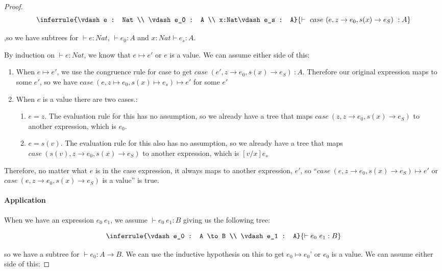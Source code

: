 \begin{proof}
$$
\inferrule {\vdash e : Nat \\  \vdash e_0 : A \\  x:Nat\vdash e_s : A}
  {\vdash \ case \ (e, z \to e_0 , s(x) \to e_S) \  : A}  
$$

,so we have subtrees for $\vdash e : Nat$, $ \vdash e_0 : A$ and $ x:Nat \vdash e_s : A$.

By induction on $\vdash e : Nat$, we know that $e \mapsto e'$ or $e$ is a value. We can assume either side of this:

\begin{enumerate}
\item{When $e \mapsto e'$, we use the congruence rule for case to get $case \ (e', z \to e_0 , s(x) \to e_S) \  : A$. Therefore our original expression maps to some $e'$, so we have $case \ (e,z \mapsto e_0, s(x) \mapsto e_s) \mapsto e'$ for some $e'$}
\item{When $e$ is a value there are two cases.:
\begin{enumerate}
\item{$e = z$. The evaluation rule for this has no assumption, so we already have a tree that maps $case \ (z, z \to e_0 , s(x) \to e_S)$ to another expression, which is $e_0$.}
\item{$e = s(v)$. The evaluation rule for this also has no assumption, so we already have a tree that maps $case \ (s(v), z \to e_0 , s(x) \to e_S)$ to another expression, which is $[v/x]e_s$ }
\end{enumerate}
}
\end{enumerate}

Therefore, no matter what $e$ is in the case expression, it always maps to another expression, $e'$, so "`$case \ (e, z \to e_0 , s(x) \to e_S) \mapsto e'$ or $case \ (e, z \to e_0 , s(x) \to e_S)$ is a value"' is true.

\paragraph{Application} When we have an expression $e_0 \ e_1$, we assume $\vdash e_0 \ e_1 : B$ giving us the following tree:

$$
\inferrule {\vdash e_0 : A \to B \\  \vdash e_1 : A}
  {\vdash e_0 \ e_1 : B}
$$

so we have a subtree for $\vdash e_0 : A \to B$. We can use the inductive hypothesis on this to get $e_0 \mapsto e_0$' or $e_0$ is a value. We can assume either side of this:


\end{proof}
